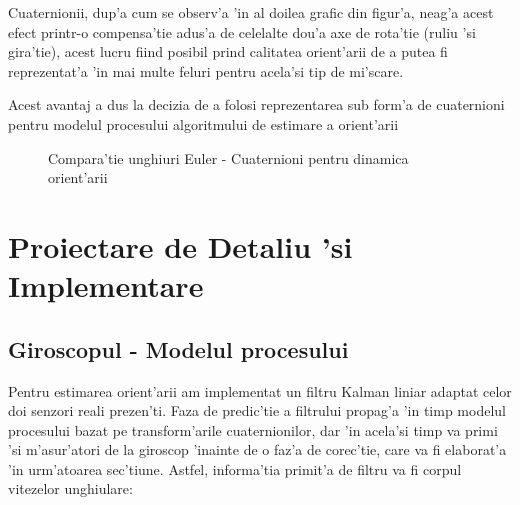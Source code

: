\documentclass[12pt,a4paper,twoside]{report}
\begin{document}
\vspace{5px}

Cuaternionii, dup'a cum se observ'a 'in al doilea grafic din figur'a, neag'a acest efect printr-o compensa'tie adus'a de celelalte dou'a axe de rota'tie (ruliu 'si gira'tie), acest lucru fiind posibil prind calitatea orient'arii de a putea fi reprezentat'a 'in mai multe feluri pentru acela'si tip de mi'scare. 

\vspace{5px}

Acest avantaj a dus la decizia de a folosi reprezentarea sub form'a de cuaternioni pentru modelul procesului algoritmului de estimare a orient'arii

\begin{figure}[h]
  \hspace*{-4cm}
  
  \caption{Compara'tie unghiuri Euler - Cuaternioni pentru dinamica orient'arii}
\end{figure}









\chapter{Proiectare de Detaliu 'si Implementare}
\label{ch:implementation}

\section{Giroscopul - Modelul procesului}

Pentru estimarea orient'arii am implementat un filtru Kalman liniar adaptat celor doi senzori reali prezen'ti. Faza de predic'tie a filtrului propag'a 'in timp modelul procesului bazat pe transform'arile cuaternionilor, dar 'in acela'si timp va primi 'si m'asur'atori de la giroscop 'inainte de o faz'a de corec'tie, care va fi elaborat'a 'in urm'atoarea sec'tiune.
Astfel, informa'tia primit'a de filtru va fi corpul vitezelor unghiulare: 
\end{document}
